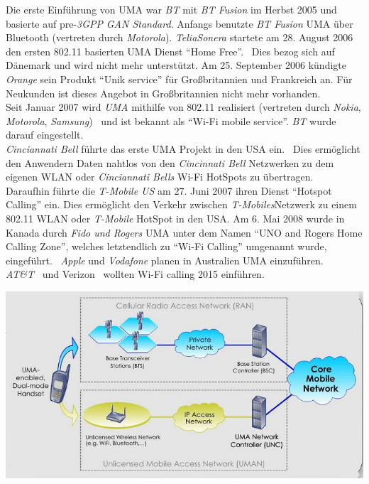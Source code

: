 \begin{multicols}{3}
Die erste Einführung von UMA war \textit{BT} mit \textit{BT Fusion} im Herbst 2005 und basierte auf pre-\textit{3GPP} \textit{GAN Standard}. Anfangs benutzte \textit{BT Fusion} UMA über Bluetooth (vertreten durch \textit{Motorola}). \textit{TeliaSonera} startete am 28. August 2006 den ersten 802.11 basierten UMA Dienst \enquote{Home Free}.~\cite{uma.6} Dies bezog sich auf Dänemark und wird nicht mehr unterstützt. Am 25. September 2006 kündigte \textit{Orange} sein Produkt \enquote{Unik service} für Großbritannien und Frankreich an. Für Neukunden ist dieses Angebot in Großbritannien nicht mehr vorhanden.\\
Seit Januar 2007 wird \textit{UMA} mithilfe von 802.11 realisiert (vertreten durch \textit{Nokia}, \textit{Motorola}, \textit{Samsung})~\cite{uma.5} und ist bekannt als \enquote{Wi-Fi mobile service}. \textit{BT} wurde darauf eingestellt.\\
\textit{Cinciannati Bell} führte das erste UMA Projekt in den USA ein.~\cite{uma.7} Dies ermöglicht den Anwendern Daten nahtlos von den \textit{Cincinnati Bell} Netzwerken zu dem eigenen WLAN oder \textit{Cinciannati Bells} Wi-Fi HotSpots zu übertragen.\\
Daraufhin führte die \textit{T-Mobile US} am 27. Juni 2007 ihren Dienst \enquote{Hotspot Calling} ein. Dies ermöglicht den Verkehr zwischen \textit{T-Mobiles}Netzwerk zu einem 802.11 WLAN oder \textit{T-Mobile} HotSpot in den USA.
Am 6. Mai 2008 wurde in Kanada durch \textit{Fido und Rogers} UMA unter dem Namen \enquote{UNO and Rogers Home Calling Zone}, welches letztendlich zu \enquote{Wi-Fi Calling} umgenannt wurde, eingeführt.~\cite{uma.8}
\textit{Apple} und \textit{Vodafone} planen in Australien UMA einzuführen.~\cite{uma.9}
\textit{AT\&T}~\cite{uma.10} und Verizon~\cite{uma.11} wollten Wi-Fi calling 2015 einführen.
\begin{Figure}
\includegraphics[width=\linewidth]{Kapitel/UMA/Grafiken/UMA.jpg}
\label{fig:uma.UMA}
\end{Figure}

\end{multicols}

